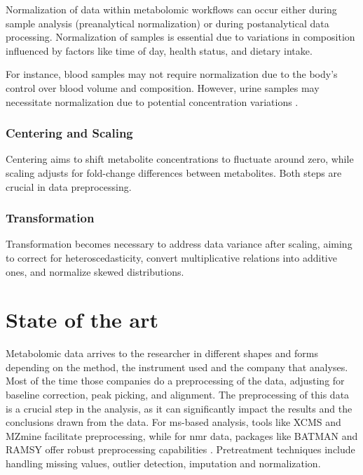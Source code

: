 \documentclass[ENG, BIB]{TFUOC}%
\begin{document}
Normalization of data within metabolomic workflows can occur either during sample analysis (preanalytical normalization) or during postanalytical data processing. Normalization of samples is essential due to variations in composition influenced by factors like time of day, health status, and dietary intake. 

For instance, blood samples may not require normalization due to the body's control over blood volume and composition. However, urine samples may necessitate normalization due to potential concentration variations \cite{ulaszewskaNutrimetabolomicsIntegrativeAction2019a}.


\subsubsection{Centering and Scaling}

 Centering aims to shift metabolite concentrations to fluctuate around zero, while scaling adjusts for fold-change differences between metabolites. Both steps are crucial in data preprocessing.

\subsubsection[Transf]{Transformation}

Transformation becomes necessary to address data variance after scaling, aiming to correct for heteroscedasticity, convert multiplicative relations into additive ones, and normalize skewed distributions.

\section{State of the art}


Metabolomic data arrives to the researcher in different shapes and forms depending on the method, the instrument used and the company that analyses. Most of the time those companies do a preprocessing of the data, adjusting for baseline correction, peak picking, and alignment. The preprocessing of this data is a crucial step in the analysis, as it can significantly impact the results and the conclusions drawn from the data. 
For \acrshort{ms}-based analysis, tools like XCMS \cite{R-xcms} and MZmine \cite{schmidIntegrativeAnalysisMultimodal2023} facilitate preprocessing, while for \acrshort{nmr} data, packages like BATMAN \cite{R-batman} and RAMSY \cite{guRAMSYRatioAnalysis2013} offer robust preprocessing capabilities . Pretreatment techniques include handling missing values, outlier detection, imputation and normalization.
\end{document}
